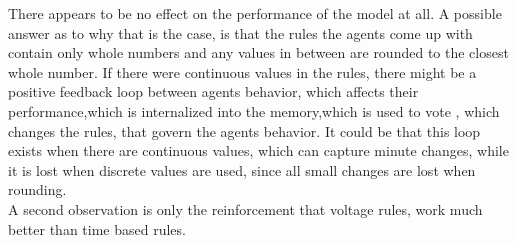 \documentclass[a4paper]{article}
\begin{document}

There appears to be no effect on the performance of the model at all. A possible answer as to why that is the case, is that 
the rules the agents come up with contain only whole numbers and any values in between are rounded to the closest whole number. 
If there were continuous values in the rules, there might be a positive feedback loop between agents behavior, which affects their 
performance,which is internalized into the memory,which is used to vote , which  changes the rules, that govern the agents behavior.
It could be that this loop exists when there are continuous values, which can capture minute changes, while it is lost
when discrete values are used, since all small changes are lost when rounding.\\
A second observation is only the reinforcement that voltage rules, work much better than time based rules. 

\clearpage
\end{document}
